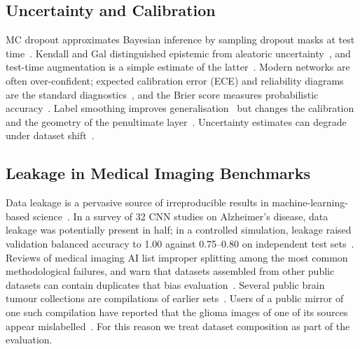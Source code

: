 \documentclass[journal,onecolumn]{IEEEtran}
\begin{document}
\subsection{Uncertainty and Calibration}
MC dropout approximates Bayesian inference by sampling dropout masks at test time~\cite{gal2016dropout}. Kendall and Gal distinguished epistemic from aleatoric uncertainty~\cite{kendall2017uncertainties}, and test-time augmentation is a simple estimate of the latter~\cite{wang2019tta}. Modern networks are often over-confident; expected calibration error (ECE) and reliability diagrams are the standard diagnostics~\cite{guo2017calibration,naeini2015bbq}, and the Brier score measures probabilistic accuracy~\cite{brier1950verification}. Label smoothing improves generalisation~\cite{szegedy2016inception} but changes the calibration and the geometry of the penultimate layer~\cite{muller2019labelsmoothing}. Uncertainty estimates can degrade under dataset shift~\cite{ovadia2019trust}.

\subsection{Leakage in Medical Imaging Benchmarks}
Data leakage is a pervasive source of irreproducible results in machine-learning-based science~\cite{kapoor2023leakage}. In a survey of 32 CNN studies on Alzheimer's disease, data leakage was potentially present in half; in a controlled simulation, leakage raised validation balanced accuracy to 1.00 against 0.75--0.80 on independent test sets~\cite{wen2020alzheimer}. Reviews of medical imaging AI list improper splitting among the most common methodological failures, and warn that datasets assembled from other public datasets can contain duplicates that bias evaluation~\cite{roberts2021pitfalls,varoquaux2022failures}. Several public brain tumour collections are compilations of earlier sets~\cite{nickparvar2021kaggle,bhuvaji2020kaggle}. Users of a public mirror of one such compilation have reported that the glioma images of one of its sources appear mislabelled~\cite{chaki2023dataport}. For this reason we treat dataset composition as part of the evaluation.

\end{document}
